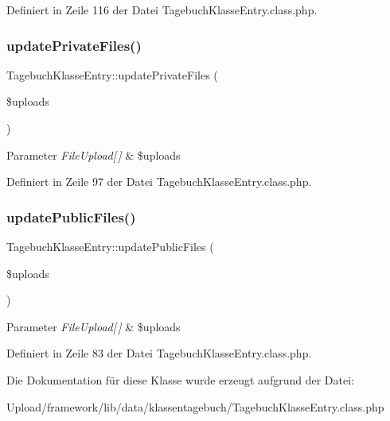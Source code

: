 Definiert in Zeile 116 der Datei Tagebuch\+Klasse\+Entry.\+class.\+php.

\mbox{\label{class_tagebuch_klasse_entry_aced773a780639cb27140fde9dd48f283}} 
\subsubsection{\texorpdfstring{update\+Private\+Files()}{updatePrivateFiles()}}
{\footnotesize\ttfamily Tagebuch\+Klasse\+Entry\+::update\+Private\+Files (\begin{DoxyParamCaption}\item[{}]{\$uploads }\end{DoxyParamCaption})}


\begin{DoxyParams}{Parameter}
{\em File\+Upload\mbox{[}$\,$\mbox{]}} & \$uploads \\
\hline
\end{DoxyParams}


Definiert in Zeile 97 der Datei Tagebuch\+Klasse\+Entry.\+class.\+php.

\mbox{\label{class_tagebuch_klasse_entry_aad0ef61bc735ffe10e679075012cde39}} 
\subsubsection{\texorpdfstring{update\+Public\+Files()}{updatePublicFiles()}}
{\footnotesize\ttfamily Tagebuch\+Klasse\+Entry\+::update\+Public\+Files (\begin{DoxyParamCaption}\item[{}]{\$uploads }\end{DoxyParamCaption})}


\begin{DoxyParams}{Parameter}
{\em File\+Upload\mbox{[}$\,$\mbox{]}} & \$uploads \\
\hline
\end{DoxyParams}


Definiert in Zeile 83 der Datei Tagebuch\+Klasse\+Entry.\+class.\+php.



Die Dokumentation für diese Klasse wurde erzeugt aufgrund der Datei\+:\begin{DoxyCompactItemize}
\item 
Upload/framework/lib/data/klassentagebuch/Tagebuch\+Klasse\+Entry.\+class.\+php\end{DoxyCompactItemize}
